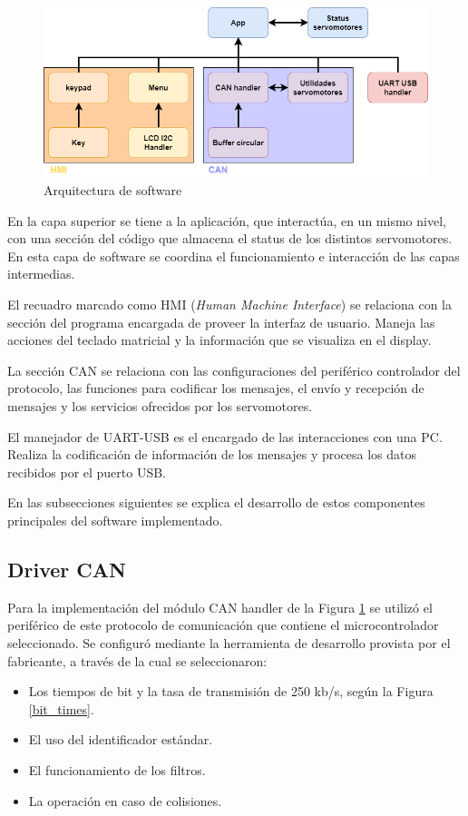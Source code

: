 \begin{figure}[htbp]
	\centering
	\includegraphics[scale=.5]{./Figures/arquitectura_software.png}
	\caption{Arquitectura de software}
	\label{fig:arq_software}
\end{figure}

En la capa superior se tiene a la aplicación, que interactúa, en un mismo nivel, con una sección del código que almacena el status de los distintos servomotores. En esta capa de software se coordina el funcionamiento e interacción de las capas intermedias.

El recuadro marcado como HMI (\textit{Human Machine Interface}) se relaciona con la sección del programa encargada de proveer la interfaz de usuario. Maneja las acciones del teclado matricial y la información que se visualiza en el display.

La sección CAN se relaciona con las configuraciones del periférico controlador del protocolo, las funciones para codificar los mensajes, el envío y recepción de mensajes y los servicios ofrecidos por los servomotores.

El manejador de UART-USB es el encargado de las interacciones con una PC. Realiza la codificación de información de los mensajes y procesa los datos recibidos por el puerto USB. 

En las subsecciones siguientes se explica el desarrollo de estos componentes principales del software implementado.

\subsection{Driver CAN}

Para la implementación del módulo CAN handler de la Figura \ref{fig:arq_software} se utilizó el periférico de este protocolo de comunicación que contiene el microcontrolador seleccionado. Se configuró mediante la herramienta de desarrollo provista por el fabricante\citep{web_microchip_studio}, a través de la cual se seleccionaron:
\begin{itemize}
	\item Los tiempos de bit y la tasa de transmisión de 250 kb/s, según la Figura \ref{bit_times}.
	\item El uso del identificador estándar.
	\item El funcionamiento de los filtros.
	\item La operación en caso de colisiones.
\end{itemize}

